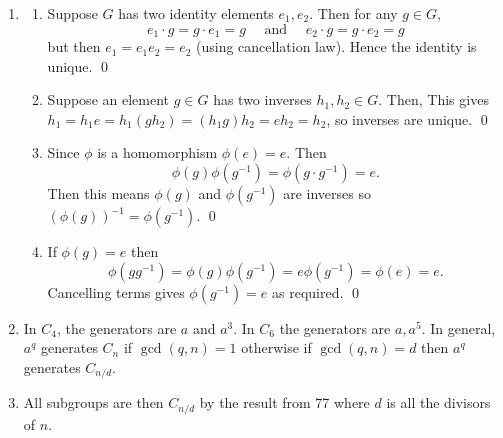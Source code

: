 \begin{enumerate}[font=\bfseries]
    \item[76] \begin{enumerate}[font=\bfseries]
              \item[a.] Suppose \(G\) has two identity elements \(e_1, e_2\). Then for any \(g \in G\),
                    \[e_1 \cdot g = g \cdot e_1 = g \quad \text{ and } \quad e_2 \cdot g = g \cdot e_2 = g\]
                    but then \(e_1 = e_1e_2 = e_2\) (using cancellation law). Hence the identity is unique. \qed
              \item[b.] Suppose an element \(g \in G\) has two inverses \(h_1, h_2 \in G\). Then,
                    This gives \(h_1 = h_1 e = h_1(gh_2) = (h_1 g)h_2 = eh_2 = h_2\), so inverses are unique. \qed
              \item[c.] Since \(\phi\) is a homomorphism \(\phi(e) = e\). Then
                    \[\phi(g)\phi(g^{-1}) = \phi(g \cdot g^{-1}) = e.\]
                    Then this means \(\phi(g)\) and \(\phi(g^{-1})\) are inverses so \((\phi(g))^{-1} = \phi(g^{-1})\). \qed
              \item[d.] If \(\phi(g) = e\) then
                    \[\phi(gg^{-1}) = \phi(g)\phi(g^{-1}) = e\phi(g^{-1}) = \phi(e) = e.\]
                    Cancelling terms gives \(\phi(g^{-1}) = e\) as required. \qed
          \end{enumerate}
    \item[77] In \(C_4\), the generators are \(a\) and \(a^3\). In \(C_6\) the generators are \(a, a^5\). In general, \(a^q\) generates \(C_n\) if \(\gcd(q, n) = 1\) otherwise if \(\gcd(q, n) = d\) then \(a^q\) generates \(C_{n / d}\).
    \item[80] All subgroups are then \(C_{n / d}\) by the result from 77 where \(d\) is all the divisors of \(n\).
\end{enumerate}